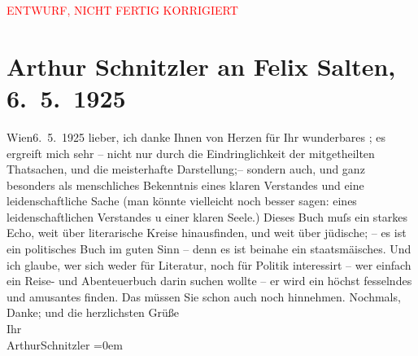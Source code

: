 
\begin{center}
            \textcolor{red}{ENTWURF, NICHT FERTIG KORRIGIERT}
                      \end{center}
            
         
         \newcommand{\erwaehntePersonen}{Personen: Felix Salten}
         \newcommand{\erwaehnteInstitutionen}{}
         \newcommand{\erwaehnteOrte}{Orte: Palästina, Wien}
         \newcommand{\erwaehnteWerke}{Werke: Neue Menschen auf alter Erde. Eine Palästinafahrt}
               \section[Arthur Schnitzler an Felix Salten, 6. 5. 1925]{ Arthur Schnitzler an Felix Salten, 6. 5. 1925}\nopagebreak{}\rehead{ }\begin{ledgroupsized}[t]{13cm}\normalsize\beginnumbering \toendnotes[C]{\smallbreak\pagebreak[2]} 
\toendnotes[C]{\smallbreak}\pstart
           \raggedleft{}{\pb}Wien6. 5. 1925\pend
           \pstart
           lieber, ich danke Ihnen von Herzen für Ihr wunderbares \label{K_L03021-1v}\label{K_L03021-1h}; es ergreift
               mich sehr – nicht nur durch die Eindringlichkeit der mitgetheilten Thatsachen, und
               die meisterhafte Darstellung;– sondern auch, und ganz besonders als menschliches
               Bekenntnis eines klaren Verstandes und eine leidenschaftliche Sache (man könnte
               vielleicht noch besser sagen: eines leidenschaftlichen Verstandes u einer klaren
               Seele.) Dieses Buch muſs ein starkes Echo, weit über literarische Kreise
               hinausfinden, und weit über jüdische; – es ist ein politisches Buch im guten Sinn –
               denn es ist beinahe ein staatsmä{\geminationn}isches. Und ich glaube,
               wer sich weder für Literatur, noch {\pb}für Politik interessirt – wer einfach
               ein Reise- und Abenteuerbuch darin \strikeout{\textcolor{gray}{finden}} suchen wollte – er wird ein höchst fesselndes und amusantes  finden. Das müssen Sie schon auch noch hinnehmen. \pend
           \pstart
           Nochmals, Danke; und die herzlichsten Grüße {\\[\baselineskip]}Ihr {\\[\baselineskip]}\spacefill\mbox{ArthurSchnitzler}\pend
           \leftskip=0em{}
         
         \endnumbering{}\end{ledgroupsized}\begin{anhang}\end{anhang}\newcommand{\dateiname}{L03021}\newcommand{\titel}{Arthur Schnitzler an Felix Salten, 6. 5. 1925}\newcommand{\editorInnen}{Martin Anton Müller und Laura Untner}
      